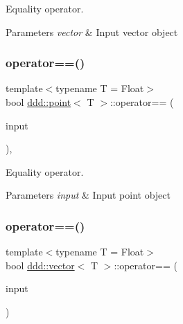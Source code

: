 Equality operator. 


\begin{DoxyParams}{Parameters}
{\em vector} & Input vector object \\
\hline
\end{DoxyParams}
\mbox{\label{classddd_1_1point_a98f8e8097257f053b85e1ee32352fda4}} 
\subsubsection{\texorpdfstring{operator==()}{operator==()}\hspace{0.1cm}{\footnotesize\ttfamily [1/2]}}
{\footnotesize\ttfamily template$<$typename T = Float$>$ \\
bool \hyperlink{classddd_1_1point}{ddd\+::point}$<$ T $>$\+::operator== (\begin{DoxyParamCaption}\item[{const \hyperlink{classddd_1_1point}{point}$<$ T $>$ \&}]{input }\end{DoxyParamCaption})\hspace{0.3cm}{\ttfamily [inline]}, {\ttfamily [inherited]}}



Equality operator. 


\begin{DoxyParams}{Parameters}
{\em input} & Input point object \\
\hline
\end{DoxyParams}
\mbox{\label{classddd_1_1vector_a5f26a6f471c836b723c94a5f68a3931d}} 
\subsubsection{\texorpdfstring{operator==()}{operator==()}\hspace{0.1cm}{\footnotesize\ttfamily [2/2]}}
{\footnotesize\ttfamily template$<$typename T = Float$>$ \\
bool \hyperlink{classddd_1_1vector}{ddd\+::vector}$<$ T $>$\+::operator== (\begin{DoxyParamCaption}\item[{const \hyperlink{classddd_1_1vector}{vector}$<$ T $>$ \&}]{input }\end{DoxyParamCaption})\hspace{0.3cm}{\ttfamily [inline]}}



